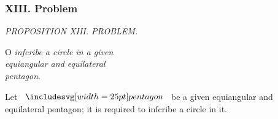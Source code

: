 \documentclass[11pt,preview]{standalone}
\begin{document}
\subsubsection{XIII. Problem}

\begin{minipage}[t]{0.54\textwidth}
    \begin{center}
        \textit{PROPOSITION XIII. PROBLEM.}\label{book4pr13} \\
    \end{center}

    \hfill

    \begin{center}
        \raggedright \lettrine[lines=3, loversize=1, nindent=0pt]{}{}O \textit{inſcribe a circle in a given\\ equiangular and equilateral\\ pentagon}.
    \end{center}
\end{minipage}%
\hfill
\begin{minipage}[t]{0.43\textwidth}
    \vspace{20pt}
    
\end{minipage}%

\hfill

\hfill

\raggedright Let $\img{pentagon}$ be a given equiangular and equilateral pentagon; it is required to inſcribe a circle in it.

\hfill
\end{document}
